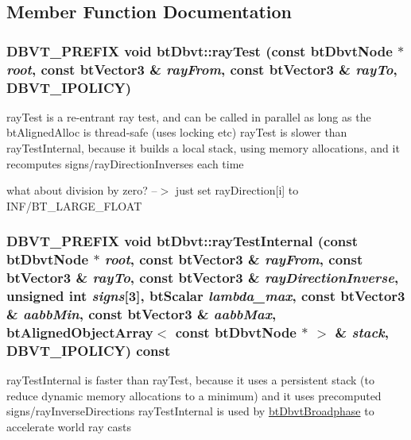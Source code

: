 \subsection{Member Function Documentation}
\hypertarget{structbt_dbvt_8e316ee3bc9bd7b7354086c0c558cfb5}{
\subsubsection[rayTest]{\setlength{\rightskip}{0pt plus 5cm}DBVT\_\-PREFIX void btDbvt::rayTest (const btDbvtNode $\ast$ {\em root}, \/  const btVector3 \& {\em rayFrom}, \/  const btVector3 \& {\em rayTo}, \/  DBVT\_\-IPOLICY)}}
\label{structbt_dbvt_8e316ee3bc9bd7b7354086c0c558cfb5}


rayTest is a re-entrant ray test, and can be called in parallel as long as the btAlignedAlloc is thread-safe (uses locking etc) rayTest is slower than rayTestInternal, because it builds a local stack, using memory allocations, and it recomputes signs/rayDirectionInverses each time 

what about division by zero? --$>$ just set rayDirection\mbox{[}i\mbox{]} to INF/BT\_\-LARGE\_\-FLOAT \hypertarget{structbt_dbvt_f8f2ca01be7eadc4732464272f580028}{
\subsubsection[rayTestInternal]{\setlength{\rightskip}{0pt plus 5cm}DBVT\_\-PREFIX void btDbvt::rayTestInternal (const btDbvtNode $\ast$ {\em root}, \/  const btVector3 \& {\em rayFrom}, \/  const btVector3 \& {\em rayTo}, \/  const btVector3 \& {\em rayDirectionInverse}, \/  unsigned int {\em signs}\mbox{[}3\mbox{]}, \/  btScalar {\em lambda\_\-max}, \/  const btVector3 \& {\em aabbMin}, \/  const btVector3 \& {\em aabbMax}, \/  {\bf btAlignedObjectArray}$<$ const btDbvtNode $\ast$ $>$ \& {\em stack}, \/  DBVT\_\-IPOLICY) const}}
\label{structbt_dbvt_f8f2ca01be7eadc4732464272f580028}


rayTestInternal is faster than rayTest, because it uses a persistent stack (to reduce dynamic memory allocations to a minimum) and it uses precomputed signs/rayInverseDirections rayTestInternal is used by \hyperlink{structbt_dbvt_broadphase}{btDbvtBroadphase} to accelerate world ray casts 

